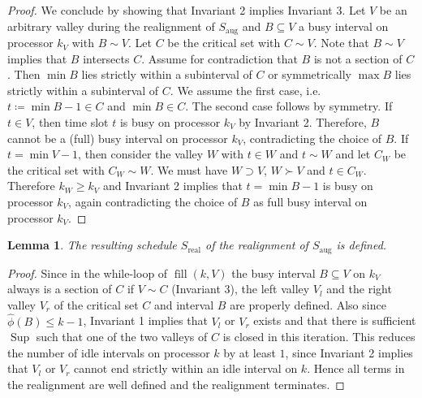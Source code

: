 \documentclass[a4paper]{article}
\DeclareMathOperator{\aug}{aug}
\DeclareMathOperator{\real}{real}
\DeclareMathOperator{\fillop}{fill}
\DeclareMathOperator{\res}{Sup}
\newtheorem{lemma}[theorem]{Lemma}
\begin{document}
\begin{proof}
  We conclude by showing that Invariant 2 implies Invariant 3.
  Let $V$ be an arbitrary valley during the realignment of $S_{\aug}$ and $B \subseteq V$ a busy interval on processor $k_V$ with $B \sim V$.
  Let $C$ be the critical set with $C \sim V$.
  Note that $B \sim V$ implies that $B$ intersects $C$.
  Assume for contradiction that $B$ is not a section of $C$.
  Then $\min B$ lies strictly within a subinterval of $C$ or symmetrically $\max B$ lies strictly within a subinterval of $C$.
  We assume the first case, i.e.\ $t\coloneqq \min B - 1 \in C$ and $\min B \in C$.
  The second case follows by symmetry.
  If $t \in V$, then time slot $t$ is busy on processor $k_V$ by Invariant 2.
  Therefore, $B$ cannot be a (full) busy interval on processor $k_V$, contradicting the choice of $B$.
  If $t = \min V-1$, then consider the valley $W$ with $t \in W$ and $t \sim W$ and let $C_W$ be the critical set with $C_W \sim W$.
  We must have $W \supset V$, $W \succ V$ and $t \in C_W$.
  Therefore $k_W \geq k_V$ and Invariant 2 implies that $t = \min B - 1$ is busy on processor $k_V$, again contradicting the choice of $B$ as full busy interval on processor $k_V$.
\end{proof}

\begin{lemma}\label{lemma:s_real}
  The resulting schedule $S_{\real}$ of the realignment of $S_{\aug}$ is defined.
\end{lemma}
\begin{proof}

  Since in the while-loop of $\fillop(k, V)$ the busy interval $B \subseteq V$ on $k_V$ always is a section of $C$ if $V \sim C$ (Invariant 3), the left valley $V_l$ and the right valley $V_r$ of the critical set $C$ and interval $B$ are properly defined.
  Also since $\hat \phi(B) \leq k - 1$, Invariant 1 implies that $V_l$ or $V_r$ exists and that there is sufficient $\res$ such that one of the two valleys of $C$ is closed in this iteration.
  This reduces the number of idle intervals on processor $k$ by at least $1$, since Invariant 2 implies that $V_l$ or $V_r$ cannot end strictly within an idle interval on $k$.
  Hence all terms in the realignment are well defined and the realignment terminates.
\end{proof}
\end{document}
